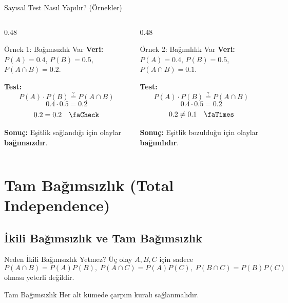 \documentclass[light]{lutbeamer}
\begin{document}
\begin{frame}{Sayısal Test Nasıl Yapılır? (Örnekler)}
    \begin{columns}[T]
        \begin{column}{0.48\textwidth}
            \begin{exampleblock}{Örnek 1: Bağımsızlık Var}
                \small
                \textbf{Veri:} $P(A)=0.4$, $P(B)=0.5$, $P(A \cap B)=0.2$.
                
                \textbf{Test:}
                \[ P(A) \cdot P(B) \stackrel{?}{=} P(A \cap B) \]
                \[ 0.4 \cdot 0.5 = 0.2 \]
                \[ 0.2 = 0.2 \quad \text{\faCheck} \]
                
                \textbf{Sonuç:} Eşitlik sağlandığı için olaylar \textbf{bağımsızdır}.
            \end{exampleblock}
        \end{column}
        \begin{column}{0.48\textwidth}
            \begin{alertblock}{Örnek 2: Bağımlılık Var}
                \small
                \textbf{Veri:} $P(A)=0.4$, $P(B)=0.5$, $P(A \cap B)=0.1$.
                
                \textbf{Test:}
                \[ P(A) \cdot P(B) \stackrel{?}{=} P(A \cap B) \]
                \[ 0.4 \cdot 0.5 = 0.2 \]
                \[ 0.2 \neq 0.1 \quad \text{\faTimes} \]
                
                \textbf{Sonuç:} Eşitlik bozulduğu için olaylar \textbf{bağımlıdır}.
            \end{alertblock}
        \end{column}
    \end{columns}
\end{frame}

\section{Tam Bağımsızlık (Total Independence)}
\subsection{İkili Bağımsızlık ve Tam Bağımsızlık}

\begin{frame}{Neden İkili Bağımsızlık Yetmez?}
    Üç olay \(A,B,C\) için sadece
    \[
    P(A\cap B)=P(A)P(B),\;
    P(A\cap C)=P(A)P(C),\;
    P(B\cap C)=P(B)P(C)
    \]
    olması yeterli değildir.

    \begin{block}{Tam Bağımsızlık}
        Her alt kümede çarpım kuralı sağlanmalıdır.
    \end{block}
\end{frame}
\end{document}
